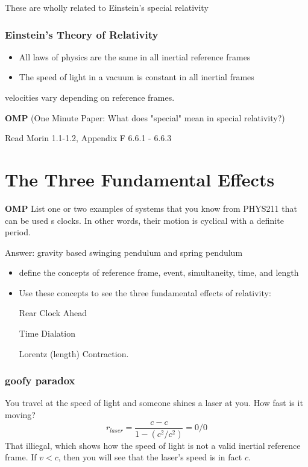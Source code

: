 \documentclass{report}
\begin{document}
These are wholly related to Einstein's special relativity

\subsection{Einstein's Theory of Relativity}
\begin{itemize}
\item
All laws of physics are the same in all inertial reference frames
\item
The speed of light in a vacuum is constant in all inertial frames

\end{itemize}

velocities vary depending on reference frames.

\textbf{OMP}
(One Minute Paper:
What does "special" mean in special relativity?)

Read Morin 1.1-1.2, Appendix F 6.6.1 - 6.6.3

\chapter{The Three Fundamental Effects}
\textbf{OMP}
List one or two examples of systems that you know from PHYS211 that can be used s clocks. In other words, their motion is cyclical with a definite period.

Answer: gravity based swinging pendulum and spring pendulum

\begin{itemize}
\item
define the concepts of reference frame, event, simultaneity, time, and length

\item
Use these concepts to see the three fundamental effects of relativity:

Rear Clock Ahead

Time Dialation

Lorentz (length) Contraction.

\end{itemize}

\subsection{goofy paradox}
You travel at the speed of light and someone shines a laser at you. How fast is it moving?
\[
r_{laser} = \frac{c-c}{1-(c^2/c^2)} = 0/0
\]
That illiegal, which shows how the speed of light is not a valid inertial reference frame.
If \(v < c\), then you will see that the laser's speed is in fact \(c\).
\end{document}
